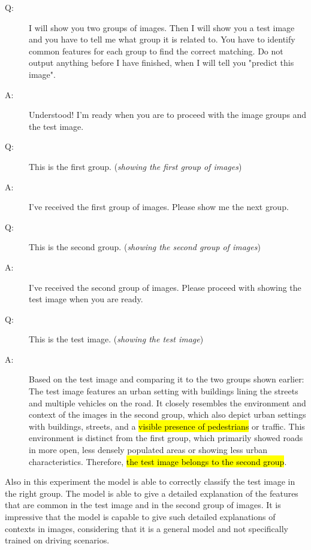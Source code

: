 {\selectfont
\begin{description}
    \item[Q:] I will show you two groups of images. Then I will show you a test 
    image and you have to tell me what group it is related to. You have to 
    identify common features for each group to find the correct matching. Do not 
    output anything before I have finished, when I will tell you "predict this 
    image".
    \item[A:] Understood! I'm ready when you are to proceed with the image groups 
    and the test image.
    \item[Q:] This is the first group. (\emph{showing the first group of images})
    \item[A:] I've received the first group of images. Please show me the next group.
    \item[Q:] This is the second group. (\emph{showing the second group of images})
    \item[A:] I've received the second group of images. Please proceed with showing 
    the test image when you are ready.
    \item[Q:] This is the test image. (\emph{showing the test image})
    \item[A:] Based on the test image and comparing it to the two groups shown earlier:
    The test image features an urban setting with buildings lining the streets 
    and multiple vehicles on the road. It closely resembles the environment and 
    context of the images in the second group, which also depict urban settings 
    with buildings, streets, and a 
    \hl{visible presence of pedestrians} or traffic. 
    This environment is distinct from the first group, which primarily showed 
    roads in more open, less densely populated areas or showing less urban 
    characteristics. 
    Therefore, \hl{the test image belongs to the second group}.
\end{description}}
Also in this experiment the model is able to correctly classify the test image 
in the right group. The model is able to give a detailed explanation of the 
features that are common in the test image and in the second group of images.
It is impressive that the model is capable to give such detailed explanations 
of contexts in images, considering that it is a general model and not specifically 
trained on driving scenarios.
